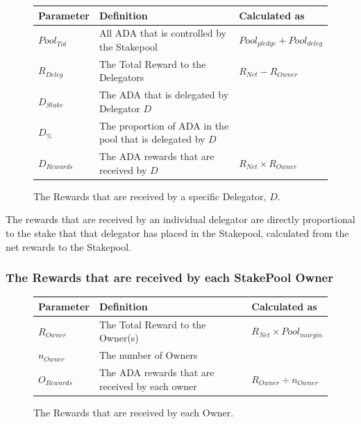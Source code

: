 \documentclass[11pt,a4paper,dvipsnames,twosided,final]{article}
\newcommand{\ada}{ADA{}}
\begin{document}
\begin{figure}[h!]
\begin{center}
\begin{tabular}{||l|p{6cm}|l||}
  \hline \hline
\textbf{Parameter} & \textbf{Definition} & \textbf{Calculated as} \\\hline
${Pool}_{Tot}$ & All \ada{} that is controlled by the Stakepool & ${Pool}_\textit{pledge} + {Pool}_\textit{deleg}$ \\\hline
$R_{Deleg}$ & The Total Reward to the Delegators & $R_{Net} - R_\textit{Owner}$ \\\hline
$D_{Stake}$ & The \ada{} that is delegated by Delegator $D$ & \\\hline
$D_\%$ & The proportion of \ada{} in the pool that is delegated by $D$ & \\\hline
$D_{Rewards}$ & The \ada{} rewards that are received by $D$ & $R_{Net} \times R_\textit{Owner}$ \\\hline
\hline
\end{tabular}
\end{center}
\caption{The Rewards that are received by a specific Delegator, $D$.}
\end{figure}

\noindent
The rewards that are received by an individual delegator are directly proportional to the
stake that that delegator has placed in the Stakepool, calculated from the net rewards to the
Stakepool.

\subsubsection*{The Rewards that are received by each StakePool Owner}

\begin{figure}[h!]
\begin{center}
\begin{tabular}{||l|p{6cm}|l||}
  \hline \hline
\textbf{Parameter}  & \textbf{Definition} & \textbf{Calculated as} \\\hline
$R_\textit{Owner}$ & The Total Reward to the Owner(s) & $R_{Net} \times {Pool}_{margin} $ \\\hline
$n_\textit{Owner}$ & The number of Owners & \\\hline
$O_{Rewards}$ & The \ada{} rewards that are received by each owner & $R_\textit{Owner} \div n_\textit{Owner}$ \\\hline
\hline
\end{tabular}
\end{center}
\caption{The Rewards that are received by each Owner.}
\end{figure}
\end{document}
